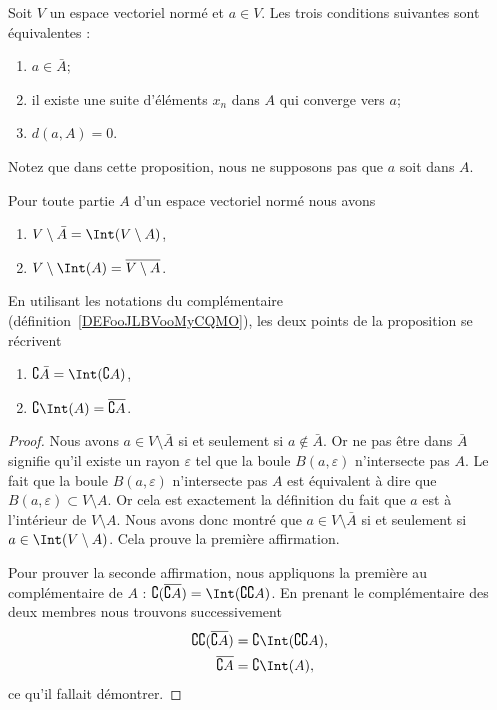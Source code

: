 \begin{proposition}     \label{PROPooEURXooHHpkhd}
	Soit \( V\) un espace vectoriel normé et \( a\in V\). Les trois conditions suivantes sont équivalentes :
	\begin{enumerate}
		\item
		      \( a\in\bar A\);
		\item
		      il existe une suite d'éléments \( x_n\) dans \( A\) qui converge vers \( a\);
		\item
		      \( d(a,A)=0\).
	\end{enumerate}
\end{proposition}
Notez que dans cette proposition, nous ne supposons pas que \( a\) soit dans \( A\).

\begin{proposition}		\label{PropComleIntBar}
	Pour toute partie \( A\) d'un espace vectoriel normé nous avons
	\begin{enumerate}
		\item
		      \( V\setminus\bar A=\Int(V\setminus A)\),
		\item
		      \( V\setminus\Int(A)=\overline{ V\setminus A }\).
	\end{enumerate}
\end{proposition}

En utilisant les notations du complémentaire (définition~\ref{DEFooJLBVooMyCQMO}), les deux points de la proposition se récrivent
\begin{enumerate}
	\item
	      \( \complement \bar A=\Int(\complement A)\),
	      \item\label{ItemLemPropComplementiv}
	      \( \complement\Int(A)=\overline{ \complement A }\).
\end{enumerate}

\begin{proof}
	Nous avons \( a\in V\setminus\bar A\) si et seulement si \( a\notin\bar A\). Or ne pas être dans \( \bar A\) signifie qu'il existe un rayon \( \varepsilon\) tel que la boule \( B(a,\varepsilon)\) n'intersecte pas \( A\). Le fait que la boule \( B(a,\varepsilon)\) n'intersecte pas \( A\) est équivalent à dire que \( B(a,\varepsilon)\subset V\setminus A\). Or cela est exactement la définition du fait que \( a\) est à l'intérieur de \( V\setminus A\). Nous avons donc montré que \( a\in V\setminus \bar A\) si et seulement si \( a\in\Int(V\setminus A)\). Cela prouve la première affirmation.

	Pour prouver la seconde affirmation, nous appliquons la première au complémentaire de \( A\) : \( \complement(\overline{ \complement A })=\Int(\complement\complement A)\). En prenant le complémentaire des deux membres nous trouvons successivement
	\begin{equation}
		\begin{aligned}[]
			\complement\complement(\overline{ \complement A }) & =\complement\Int(\complement\complement A), \\
			\overline{ \complement A }                         & =\complement\Int(A),
		\end{aligned}
	\end{equation}
	ce qu'il fallait démontrer.
\end{proof}

